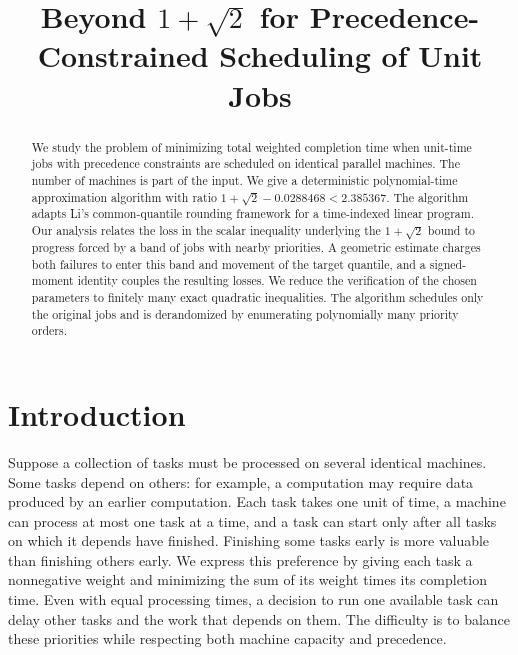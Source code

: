 ﻿\title{Beyond $1+\sqrt2$ for Precedence-Constrained Scheduling of Unit Jobs}
\author{}
\date{}
\maketitle

\begin{abstract}
We study the problem of minimizing total weighted completion time when
unit-time jobs with precedence constraints are scheduled on identical
parallel machines. The number of machines is part of the input. We give
a deterministic polynomial-time approximation algorithm with ratio
$1+\sqrt2-0.0288468<2.385367$. The algorithm adapts Li's
common-quantile rounding framework for a time-indexed linear program.
Our analysis relates the loss in the scalar inequality underlying the
$1+\sqrt2$ bound to progress forced by a band of jobs with nearby
priorities. A geometric estimate charges both failures to enter this
band and movement of the target quantile, and a signed-moment identity
couples the resulting losses. We reduce the verification of the chosen
parameters to finitely many exact quadratic inequalities. The algorithm
schedules only the original jobs and is derandomized by enumerating
polynomially many priority orders.
\end{abstract}

\section{Introduction}
\label{sec:foundations-introduction}

Suppose a collection of tasks must be processed on several identical
machines. Some tasks depend on others: for example, a computation may
require data produced by an earlier computation. Each task takes one unit
of time, a machine can process at most one task at a time, and a task can
start only after all tasks on which it depends have finished. Finishing
some tasks early is more valuable than finishing others early. We express
this preference by giving each task a nonnegative weight and minimizing
the sum of its weight times its completion time. Even with equal
processing times, a decision to run one available task can delay other
tasks and the work that depends on them. The difficulty is to balance
these priorities while respecting both machine capacity and precedence.

